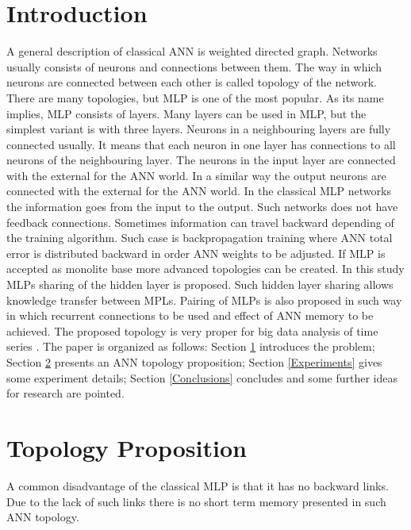 \documentclass{llncs}
\begin{document}

\section{Introduction} \label{Introduction}

A general description of classical ANN is weighted directed graph. Networks usually consists of neurons and connections between them. The way in which neurons are connected between each other is called topology of the network. There are many topologies, but MLP is one of the most popular. As its name implies, MLP consists of layers. Many layers can be used in MLP, but the simplest variant is with three layers. Neurons in a neighbouring layers are fully connected usually. It means that each neuron in one layer has connections to all neurons of the neighbouring layer. The neurons in the input layer are connected with the external for the ANN world. In a similar way the output neurons are connected with the external for the ANN world. In the classical MLP networks the information goes from the input to the output. Such networks does not have feedback connections. Sometimes information can travel backward depending of the training algorithm. Such case is backpropagation training where ANN total error is distributed backward in order ANN weights to be adjusted. If MLP is accepted as monolite base more advanced topologies can be created. In this study MLPs sharing of the hidden layer is proposed. Such hidden layer sharing allows knowledge transfer between MPLs. Pairing of MLPs is also proposed in such way in which recurrent connections to be used and effect of ANN memory to be achieved. The proposed topology is very proper for big data analysis of time series \cite{atanasova01}. The paper is organized as follows: Section \ref{Introduction} introduces the problem; Section \ref{Topology Proposition} presents an ANN topology proposition; Section \ref{Experiments} gives some experiment details; Section \ref{Conclusions} concludes and some further ideas for research are pointed.

\section{Topology Proposition} \label{Topology Proposition}

A common disadvantage of the classical MLP is that it has no backward links. Due to the lack of such links there is no short term memory presented in such ANN topology. 
\end{document}
